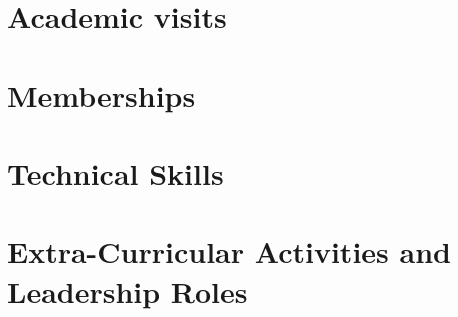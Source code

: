 \documentclass[margin,line]{res}
\begin{document}
\begin{resume}
\section{\sc Academic visits}
    
\section{\sc Memberships}
    
\section{\sc Technical Skills}
    
\section{\sc Extra-Curricular Activities and Leadership Roles}
    
%     
\end{resume}
\end{document}
